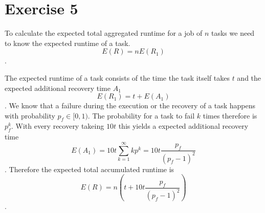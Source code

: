 \section*{Exercise 5}
To calculate the expected total aggregated runtime for a job of $n$ tasks we need to know the expected runtime of a task.\[E(R) = nE(R_1)\].

The expected runtime of a task consists of the time the task itself takes $t$ and the expected additional recovery time $A_1$ \[E(R_1) = t + E(A_1)\].
We know that a failure during the execution or the recovery of a task happens with probability $p_f \in[0,1)$.
The probability for a task to fail $k$ times therefore is $p_f^k$.
With every recovery takeing $10t$ this yields a expected additional recovery time \[E(A_1) = 10t\sum_{k=1}^{\infty}kp^k = 10t\frac{p_f}{(p_f-1)^2}\].
Therefore the expected total accumulated runtime is \[E(R) = n\left(t+10t  \frac{p_f}{(p_f-1)^2}\right)\].